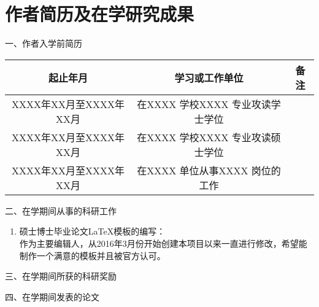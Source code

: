 
\chapter*{\centering 作者简历及在学研究成果}

\noindent 一、作者入学前简历 \par
\vspace{2ex}
\begin{tabular}{|c|c|c|}\hline
起止年月 & 学习或工作单位 & 备注 \\ \hline
XXXX年XX月至XXXX年XX月 & 在XXXX 学校XXXX 专业攻读学士学位 &  \\ \hline
XXXX年XX月至XXXX年XX月 & 在XXXX 学校XXXX 专业攻读硕士学位 &  \\ \hline
XXXX年XX月至XXXX年XX月 & 在XXXX 单位从事XXXX 岗位的工作 &  \\ \hline
\end{tabular} 

\noindent 二、在学期间从事的科研工作 \par
\begin{enumerate}
\item 硕士博士毕业论文\LaTeX 模板的编写：\\
作为主要编辑人，从2016年3月份开始创建本项目以来一直进行修改，希望能制作一个满意的模板并且被官方认可。
\end{enumerate}
\noindent 三、在学期间所获的科研奖励 \par
\par
\noindent 四、在学期间发表的论文 \par






